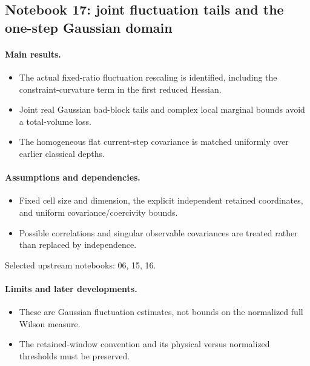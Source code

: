 \subsection{Notebook 17: joint fluctuation tails and the one-step Gaussian domain}
\label{hnc-17}
\noindent{}\par

\paragraph{Main results.}
\begin{itemize}
\item The actual fixed-ratio fluctuation rescaling is identified, including the constraint-curvature term in the first reduced Hessian.
\item Joint real Gaussian bad-block tails and complex local marginal bounds avoid a total-volume loss.
\item The homogeneous flat current-step covariance is matched uniformly over earlier classical depths.
\end{itemize}

\paragraph{Assumptions and dependencies.}
\begin{itemize}
\item Fixed cell size and dimension, the explicit independent retained coordinates, and uniform covariance/coercivity bounds.
\item Possible correlations and singular observable covariances are treated rather than replaced by independence.
\end{itemize}

Selected upstream notebooks: 06, 15, 16.\par

\paragraph{Limits and later developments.}
\begin{itemize}
\item These are Gaussian fluctuation estimates, not bounds on the normalized full Wilson measure.
\item The retained-window convention and its physical versus normalized thresholds must be preserved.
\end{itemize}

